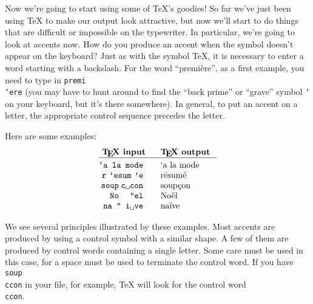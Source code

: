 Now we're going to start using some of \TeX{}'s goodies! So far 
we've just been using \TeX{} to make our output look attractive, 
but now we'll start to do things that are difficult or impossible 
on the typewriter. In particular, we're going to look at accents 
now. How do you produce an accent when the symbol doesn't appear on 
the keyboard? Just as with the symbol \TeX{}, it is necessary to 
enter a word starting with a backslash. For the word ``premi\`ere'', 
as a first example, you need to type in {\tt premi\\`ere} 
(you may have to hunt around to find the ``back prime'' 
or ``grave'' symbol {\tt `} on your keyboard, but it's there 
somewhere). In general, to put an accent 
on a letter, the appropriate control sequence precedes the letter. 
 
Here are some examples: 
$$\vbox{ 
 
\halign{ 
\strut \hfil\tt # & \quad # \hfil\cr 
\bf \TeX{} input & \bf \TeX{} output \cr 
\noalign{\hrule} \noalign{\smallskip} 
\\`a la mode          & \`a la mode \cr 
r\\'esum\\'e          & r\'esum\'e  \cr 
soup\\c{\sp}con   & soup\c con  \cr 
No\\"el               & No\"el      \cr 
na\\"\\i{\sp}ve    & na\"\i ve   \cr 
} 
}$$ 
 
 
We see several principles illustrated by these examples. Most 
accents are produced by using a control symbol with a similar 
shape. A few of them are produced by control words containing a 
single letter. Some care must be used in this case, for a space 
must be used to terminate the control word. If you have {\tt 
soup\\ccon} in your file, for example, \TeX{} will look for the 
control word {\tt\\ccon}. 
 
